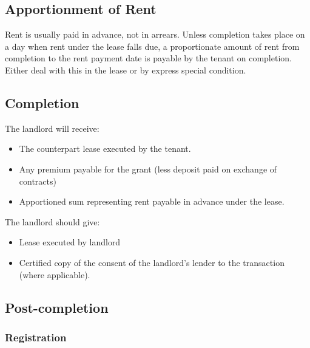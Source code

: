 \documentclass[
]{article}
\providecommand{\tightlist}{%
  \setlength{\itemsep}{0pt}\setlength{\parskip}{0pt}}
\begin{document}
\hypertarget{apportionment-of-rent}{%
\subsection{Apportionment of Rent}\label{apportionment-of-rent}}

Rent is usually paid in advance, not in arrears. Unless completion takes
place on a day when rent under the lease falls due, a proportionate
amount of rent from completion to the rent payment date is payable by
the tenant on completion. Either deal with this in the lease or by
express special condition.

\hypertarget{completion}{%
\subsection{Completion}\label{completion}}

The landlord will receive:

\begin{itemize}
\tightlist
\item
  The counterpart lease executed by the tenant.
\item
  Any premium payable for the grant (less deposit paid on exchange of
  contracts)
\item
  Apportioned sum representing rent payable in advance under the lease.
\end{itemize}

The landlord should give:

\begin{itemize}
\tightlist
\item
  Lease executed by landlord
\item
  Certified copy of the consent of the landlord's lender to the
  transaction (where applicable).
\end{itemize}

\hypertarget{post-completion}{%
\subsection{Post-completion}\label{post-completion}}

\hypertarget{registration}{%
\subsubsection{Registration}\label{registration}}
\end{document}
